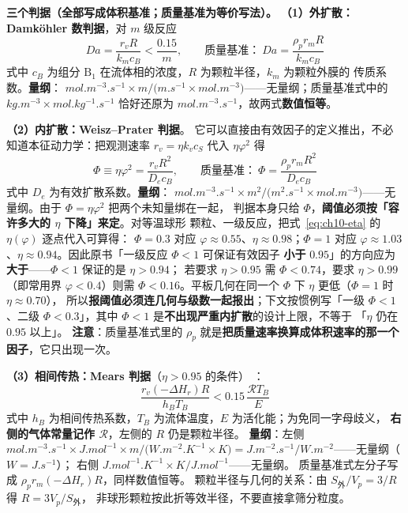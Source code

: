\begin{principle}
\textbf{三个判据（全部写成体积基准；质量基准为等价写法）。}
\textbf{（1）外扩散：Damk\"ohler 数判据}，对 $m$ 级反应
\begin{equation}
Da=\frac{r_vR}{k_mc_B}<\frac{0.15}{m},
\qquad\text{质量基准：}\ Da=\frac{\rho_pr_mR}{k_mc_B}
\label{eq:ch10-da}
\end{equation}
式中 $c_B$ 为组分 $\mathrm{B_1}$ 在流体相的浓度，$R$ 为颗粒半径，$k_m$ 为颗粒外膜的
传质系数。\textbf{量纲}：
$\unit{mol.m^{-3}.s^{-1}}\times\unit{m}\big/\bigl(\unit{m.s^{-1}}\times
\unit{mol.m^{-3}}\bigr)$——无量纲；质量基准式中的
$\unit{kg.m^{-3}}\times\unit{mol.kg^{-1}.s^{-1}}$ 恰好还原为
$\unit{mol.m^{-3}.s^{-1}}$，故两式\textbf{数值恒等}。

\textbf{（2）内扩散：Weisz--Prater 判据}。
它可以直接由有效因子的定义推出，不必知道本征动力学：把观测速率
$r_v=\eta k_vc_S$ 代入 $\eta\varphi^2$ 得
\begin{equation}
\Phi\equiv\eta\varphi^{2}=\frac{r_vR^{2}}{D_ec_B},
\qquad\text{质量基准：}\ \Phi=\frac{\rho_pr_mR^{2}}{D_ec_B}
\label{eq:ch10-wp}
\end{equation}
式中 $D_e$ 为有效扩散系数。\textbf{量纲}：
$\unit{mol.m^{-3}.s^{-1}}\times\unit{m^2}\big/\bigl(\unit{m^2.s^{-1}}\times
\unit{mol.m^{-3}}\bigr)$——无量纲。由于 $\Phi=\eta\varphi^{2}$ 把两个未知量绑在一起，
判据本身只给 $\Phi$，\textbf{阈值必须按「容许多大的 $\eta$ 下降」来定}。对等温球形
颗粒、一级反应，把式~\eqref{eq:ch10-eta} 的 $\eta(\varphi)$ 逐点代入可算得：
$\Phi=0.3$ 对应 $\varphi\approx0.55$、$\eta\approx0.98$；$\Phi=1$ 对应
$\varphi\approx1.03$、$\eta\approx0.94$。因此原书「一级反应 $\Phi<1$ 可保证有效因子
\textbf{小于} $0.95$」的方向应为\textbf{大于}——$\Phi<1$ 保证的是 $\eta>0.94$；
若要求 $\eta>0.95$ 需 $\Phi<0.74$，要求 $\eta>0.99$（即常用界 $\varphi<0.4$）则需
$\Phi<0.16$。平板几何在同一个 $\Phi$ 下 $\eta$ 更低（$\Phi=1$ 时 $\eta\approx0.70$），
所以\textbf{报阈值必须连几何与级数一起报出}；下文按惯例写「一级 $\Phi<1$、二级
$\Phi<0.3$」，其中 $\Phi<1$ 是\textbf{不出现严重内扩散}的设计上限，不等于
「$\eta$ 仍在 $0.95$ 以上」。
\textbf{注意}：质量基准式里的 $\rho_p$ 就是\textbf{把质量速率换算成体积速率的那一个
因子}，它只出现一次。

\textbf{（3）相间传热：Mears 判据}（$\eta>0.95$ 的条件）
：
\begin{equation}
\frac{r_v(-\Delta H_r)R}{h_BT_B}<0.15\,\frac{\mathscr{R}T_B}{E}
\label{eq:ch10-mears}
\end{equation}
式中 $h_B$ 为相间传热系数，$T_B$ 为流体温度，$E$ 为活化能；为免同一字母歧义，
\textbf{右侧的气体常量记作 $\mathscr{R}$}，左侧的 $R$ 仍是颗粒半径。
\textbf{量纲}：左侧
$\unit{mol.m^{-3}.s^{-1}}\times\unit{J.mol^{-1}}\times\unit{m}\big/
\bigl(\unit{W.m^{-2}.K^{-1}}\times\unit{K}\bigr)
=\unit{J.m^{-2}.s^{-1}}\big/\unit{W.m^{-2}}$——无量纲（$\unit{W}=\unit{J.s^{-1}}$）；
右侧 $\unit{J.mol^{-1}.K^{-1}}\times\unit{K}\big/\unit{J.mol^{-1}}$——无量纲。
质量基准式左分子写成 $\rho_pr_m(-\Delta H_r)R$，同样数值恒等。
颗粒半径与几何的关系：由 $S_{\text{外}}/V_p=3/R$ 得 $R=3V_p/S_{\text{外}}$，
非球形颗粒按此折等效半径，不要直接拿筛分粒度。
\end{principle}

